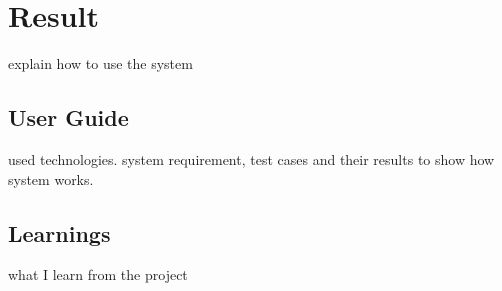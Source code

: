 
\chapter{Result} %

\label{ch:result} %

explain how to use the system

\section{User Guide}
\label{ch:result:user_guide}

used technologies. system requirement, test cases and their results to show how system works.

\section{Learnings}

what I learn from the project
